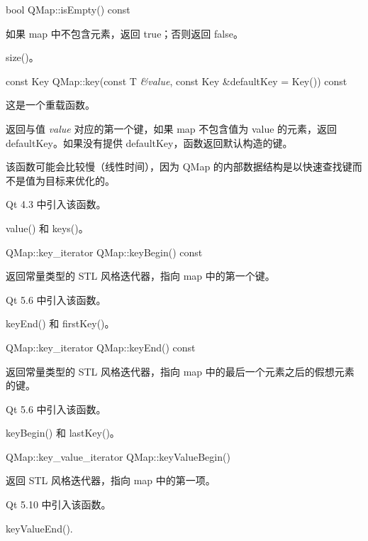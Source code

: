 \splitLine

bool QMap::isEmpty() const

如果 map 中不包含元素，返回 true；否则返回 false。

\begin{notice}
size()。
\end{notice}

\splitLine

const Key QMap::key(const T \emph{\&value}, const Key \&defaultKey = Key()) const

这是一个重载函数。

返回与值 \emph{value} 对应的第一个键，如果 map 不包含值为 value 的元素，返回 defaultKey。如果没有提供 defaultKey，函数返回默认构造的键。

该函数可能会比较慢（线性时间），因为 QMap 的内部数据结构是以快速查找键而不是值为目标来优化的。

Qt 4.3 中引入该函数。

\begin{seeAlso}
value() 和 keys()。
\end{seeAlso}

\splitLine

QMap::key\_iterator QMap::keyBegin() const

返回常量类型的 STL 风格迭代器，指向 map 中的第一个键。

Qt 5.6 中引入该函数。

\begin{seeAlso}
keyEnd() 和 firstKey()。
\end{seeAlso}

\splitLine

QMap::key\_iterator QMap::keyEnd() const

返回常量类型的 STL 风格迭代器，指向 map 中的最后一个元素之后的假想元素的键。

Qt 5.6 中引入该函数。

\begin{seeAlso}
keyBegin() 和 lastKey()。
\end{seeAlso}

\splitLine

QMap::key\_value\_iterator QMap::keyValueBegin()

返回 STL 风格迭代器，指向 map 中的第一项。

Qt 5.10 中引入该函数。

\begin{seeAlso}
keyValueEnd().
\end{seeAlso}

\splitLine

